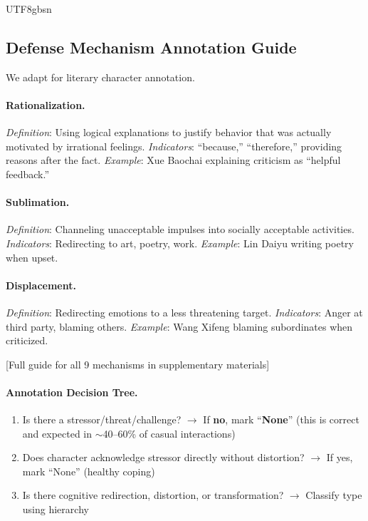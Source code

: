 \documentclass[11pt]{article}
\begin{document}
\begin{CJK*}{UTF8}{gbsn}
\subsection{Defense Mechanism Annotation Guide}
\label{sec:dmguide}

We adapt \citet{vaillant1994ego} for literary character annotation.

\paragraph{Rationalization.} \textit{Definition}: Using logical explanations to justify behavior that was actually motivated by irrational feelings. \textit{Indicators}: ``because,'' ``therefore,'' providing reasons after the fact. \textit{Example}: Xue Baochai explaining criticism as ``helpful feedback.''

\paragraph{Sublimation.} \textit{Definition}: Channeling unacceptable impulses into socially acceptable activities. \textit{Indicators}: Redirecting to art, poetry, work. \textit{Example}: Lin Daiyu writing poetry when upset.

\paragraph{Displacement.} \textit{Definition}: Redirecting emotions to a less threatening target. \textit{Indicators}: Anger at third party, blaming others. \textit{Example}: Wang Xifeng blaming subordinates when criticized.

[Full guide for all 9 mechanisms in supplementary materials]

\paragraph{Annotation Decision Tree.}
\begin{enumerate}
    \item Is there a stressor/threat/challenge? $\rightarrow$ If \textbf{no}, mark ``\textbf{None}'' (this is correct and expected in $\sim$40--60\% of casual interactions)
    \item Does character acknowledge stressor directly without distortion? $\rightarrow$ If yes, mark ``None'' (healthy coping)
    \item Is there cognitive redirection, distortion, or transformation? $\rightarrow$ Classify type using hierarchy
\end{enumerate}


\end{CJK*}
\end{document}
